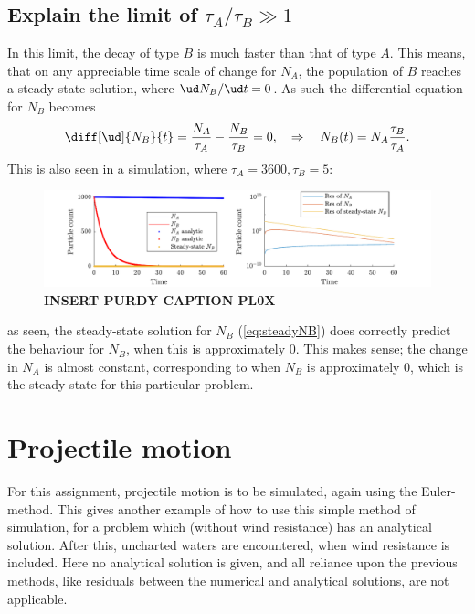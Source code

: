 \documentclass[a4paper,10pt]{article} 	%
\numberwithin{equation}{section}
\begin{document}
	\subsection{Explain the limit of $ \tau_A/\tau_B \gg 1 $}
	In this limit, the decay of type $ B $ is much faster than that of type $ A $. This means, that on any appreciable time scale of change for $ N_A $, the population of $ B $ reaches a steady-state solution, where $ \ud N_B/\ud t = 0 $. As such the differential equation for $ N_B $ becomes
	\begin{equation}\label{eq:steadyNB}
		\diff[\ud]{N_B}{t} = \frac{N_A}{\tau_A} - \frac{N_B}{\tau_B} = 0, \quad \Rightarrow \quad N_B(t) = N_A \frac{\tau_B}{\tau_A}.
	\end{equation}
	This is also seen in a simulation, where $ \tau_A = 3600,\tau_B = 5 $:
	\begin{figure}[H]
		\centering
		\includegraphics[width=\linewidth]{largetau.pdf}
		\caption{\textbf{INSERT PURDY CAPTION PL0X}}
		\label{fig:largeTau}
	\end{figure}
	as seen, the steady-state solution for $ N_B $ (\eqref{eq:steadyNB}) does correctly predict the behaviour for $ N_B $, when this is approximately 0. This makes sense; the change in $ N_A $ is almost constant, corresponding to when $ N_B $ is approximately 0, which is the steady state for this particular problem.
	
	
	\section{Projectile motion}
	For this assignment, projectile motion is to be simulated, again using the Euler-method. This gives another example of how to use this simple method of simulation, for a problem which (without wind resistance) has an analytical solution. After this, uncharted waters are encountered, when wind resistance is included. Here no analytical solution is given, and all reliance upon the previous methods, like residuals between the numerical and analytical solutions, are not applicable.
	
\end{document}
